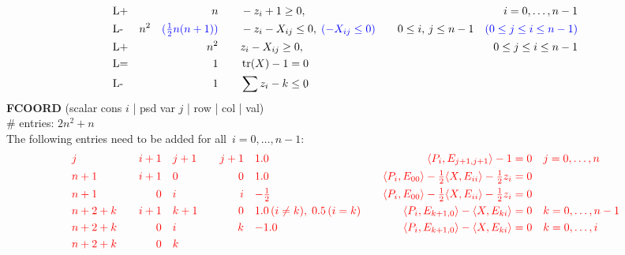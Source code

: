 \documentclass[11pt,a4paper]{article}
\DeclareMathOperator{\tr}{tr}
\theoremstyle{definition}
\begin{document}
{\[\begin{aligned}
    &\text{L+} &n \qquad & -z_i + 1 \geq 0, \quad & i = 0,\dots,n-1 \\
    &\text{L-} &n^2\quad {\color{blue}(\tfrac{1}{2}n(n+1))} \qquad & -z_i - X_{ij} \leq 0,\;
    {\color{blue} (-X_{ij} \leq 0)}\quad & 0 \leq i,\, j \leq n-1\quad {\color{blue}(0
    \leq j \leq i \leq n-1)} \\
    &\text{L+} &n^2 \qquad & z_i - X_{ij} \geq 0,\quad & 0
    \leq j \leq i \leq n-1 \\
    &\text{L=}  &1 \qquad & \tr(X) - 1 = 0 \\
    &\text{L-}  &1 \qquad & \sum z_i - k \leq 0
  \end{aligned}
\]
\textbf{FCOORD} (scalar cons $i$ | psd var $j$ | row | col | val) \\
\# entries: $2n^2+n$  \\
{\color{red} The following entries need to be added for all~$i = 0,\dots,n-1$}:
\[
  \begin{aligned}
    &{\color{red}j} \quad &{\color{red}i+1} \quad & {\color{red}j+1} \quad
    & {\color{red}j+1} \quad & {\color{red}1.0} \quad & {\color{red}
      \langle P_i,
      E_{j+1,j+1} \rangle - 1 = 0} \quad & {\color{red} j = 0,\dots,n} \\
    &{\color{red}n+1} \quad &{\color{red}i+1} \quad & {\color{red}0} \quad
    & {\color{red}0} \quad & {\color{red}1.0} \quad & {\color{red} \langle
      P_i, E_{00} \rangle - \tfrac{1}{2}\langle X,E_{ii}\rangle -
      \tfrac{1}{2}z_i = 0} \quad & \\
    &{\color{red}n+1} \quad &{\color{red}0} \quad & {\color{red}i} \quad
    & {\color{red}i} \quad & {\color{red}-\tfrac{1}{2}} \quad & {\color{red} \langle
      P_i, E_{00} \rangle - \tfrac{1}{2}\langle X,E_{ii}\rangle -
      \tfrac{1}{2}z_i = 0} \quad & \\
    &{\color{red}n+2+k} \quad &{\color{red}i+1} \quad & {\color{red}k+1} \quad
    & {\color{red}0} \quad & {\color{red}1.0\, (i\neq k),\; 0.5\, (i=k)} \quad & {\color{red} \langle
      P_i, E_{k+1,0} \rangle - \langle X,E_{ki}\rangle = 0} \quad &
    {\color{red} k = 0,\dots,n-1} \\
    &{\color{red}n+2+k} \quad &{\color{red}0} \quad & {\color{red}i} \quad
    & {\color{red}k} \quad & {\color{red}-1.0} \quad & {\color{red} \langle
      P_i, E_{k+1,0} \rangle - \langle X,E_{ki}\rangle = 0} \quad &
    {\color{red} k = 0,\dots,i} \\
    &{\color{red}n+2+k} \quad &{\color{red}0} \quad & {\color{red}k} \quad

\end{aligned}\]}
\end{document}
